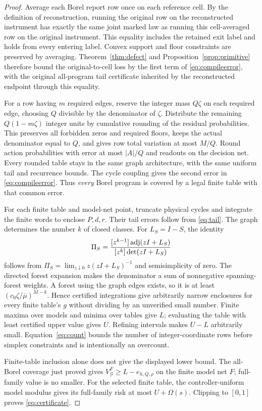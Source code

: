 \begin{proof}
Average each Borel report row once on each reference cell. By the definition of reconstruction, running the original row on the reconstructed instrument has exactly the same joint marked law as running this cell-averaged row on the original instrument. This equality includes the retained exit label and holds from every entering label. Convex support and floor constraints are preserved by averaging. Theorem~\ref{thm:defect} and Proposition~\ref{prop:primitive} therefore bound the original-to-cell loss by the first term of \eqref{eq:compileerror}, with the original all-program tail certificate inherited by the reconstructed endpoint through this equality.

For a row having $m$ required edges, reserve the integer mass $Q\zeta$ on each required edge, choosing $Q$ divisible by the denominator of $\zeta$. Distribute the remaining $Q(1-m\zeta)$ integer units by cumulative rounding of the residual probabilities. This preserves all forbidden zeros and required floors, keeps the actual denominator equal to $Q$, and gives row total variation at most $M/Q$. Round action probabilities with error at most $|A|/Q$ and readouts on the decision net. Every rounded table stays in the same graph architecture, with the same uniform tail and recurrence bounds. The cycle coupling gives the second error in \eqref{eq:compileerror}. Thus \emph{every} Borel program is covered by a legal finite table with that common error.

For each finite table and model-net point, truncate physical cycles and integrate the finite words to enclose $P,d,r$. Their tail errors follow from \eqref{eq:tail}. The graph determines the number $k$ of closed classes. For $L_S=I-S$, the identity
\begin{equation}\label{eq:forest}
 \Pi_S={ [z^{k-1}]\operatorname{adj}(zI+L_S)
                   \over [z^k]\det(zI+L_S)}
\end{equation}
follows from $\Pi_S=\lim_{z\downarrow0}z(zI+L_S)^{-1}$ and semisimplicity of zero. The directed forest expansion \cite{ChebotarevAgaev} makes the denominator a sum of nonnegative spanning-forest weights. A forest using the graph edges exists, so it is at least $(c_0\zeta/\bar\mu)^{M-k}$. Hence certified integrations give arbitrarily narrow enclosures for every finite table's $g$ without dividing by an unverified small number. Finite maxima over models and minima over tables give $L$; evaluating the table with least certified upper value gives $U$. Refining intervals makes $U-L$ arbitrarily small. Equation~\eqref{eq:count} bounds the number of integer-coordinate rows before simplex constraints and is intentionally an overcount.

Finite-table inclusion alone does not give the displayed lower bound. The all-Borel coverage just proved gives $V_{\mathcal G}^{F}\ge L-e_{h,Q,\rho}$ on the finite model net $F$; full-family value is no smaller. For the selected finite table, the controller-uniform model modulus gives its full-family risk at most $U+\Omega(s)$. Clipping to $[0,1]$ proves \eqref{eq:certificate}.
\end{proof}


